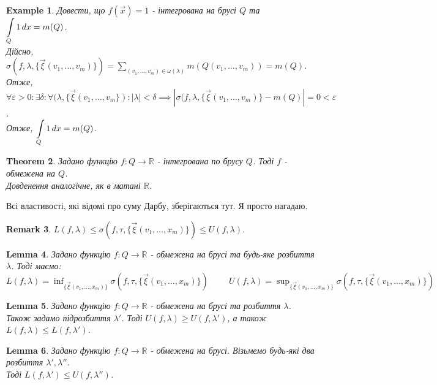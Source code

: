 \documentclass[a4paper, 10pt]{article}
\theoremstyle{theoremdd}
\newtheorem{theorem}{Theorem}[subsection]
\theoremstyle{theoremdd}
\theoremstyle{theoremdd}
\theoremstyle{theoremdd}
\newtheorem{example}[theorem]{Example}
\theoremstyle{theoremdd}
\theoremstyle{theoremdd}
\newtheorem{remark}[theorem]{Remark}
\theoremstyle{theoremdd}
\newtheorem{lemma}[theorem]{Lemma}
\theoremstyle{theoremdd}
\begin{document}
\begin{example}
Довести, що $f(\vec{x}) = 1$ - інтегрована на брусі $Q$ та $\displaystyle\int\displaylimits_Q 1\,dx = m(Q)$.\\
Дійсно, $\displaystyle\sigma(f,\lambda,\{\vec{\xi}(v_1,\dots,v_m) \}) = \sum_{(v_1,\dots,v_m) \in \omega(\lambda)} m(Q(v_1,\dots,v_m)) = m(Q)$.\\
Отже, $\forall \varepsilon > 0: \exists \delta: \forall (\lambda, \{ \vec{\xi}(v_1,\dots,v_m \}): |\lambda| < \delta \implies |\sigma(f,\lambda,\{ \vec{\xi}(v_1,\dots,v_m) \} - m(Q)| = 0 < \varepsilon$.\\
Отже, $\displaystyle\int\displaylimits_Q 1\,dx = m(Q)$.
\end{example}

\begin{theorem}
Задано функцію $f: Q \to \mathbb{R}$ - інтегрована по брусу $Q$. Тоді $f$ - обмежена на $Q$.\\
\textit{Довденення аналогічне, як в матані $\mathbb{R}$.}
\end{theorem}

Всі властивості, які відомі про суму Дарбу, зберігаються тут. Я просто нагадаю.

\begin{remark}
$L(f,\lambda) \leq \sigma(f,\tau,\{ \vec{\xi}(v_1,\dots,x_m) \}) \leq U(f,\lambda)$.
\end{remark}

\begin{lemma}
Задано функцію $f: Q \to \mathbb{R}$ - обмежена на брусі та будь-яке розбиття $\lambda$. Тоді маємо:\\
$L(f,\lambda) = \displaystyle\inf_{\{ \vec{\xi}(v_1,\dots,x_m) \}} \sigma(f,\tau,\{ \vec{\xi}(v_1,\dots,x_m) \}) \hspace{1cm} U(f,\lambda) = \displaystyle\sup_{\{ \vec{\xi}(v_1,\dots,x_m) \}} \sigma(f,\tau,\{ \vec{\xi}(v_1,\dots,x_m) \})$
\end{lemma}

\begin{lemma}
Задано функцію $f: Q \to \mathbb{R}$ - обмежена на брусі та розбиття $\lambda$. Також задамо підрозбиття $\lambda'$. Тоді $U(f,\lambda) \geq U(f,\lambda')$, а також $L(f,\lambda) \leq L(f,\lambda')$.
\end{lemma}

\begin{lemma}
Задано функцію $f: Q \to \mathbb{R}$ - обмежена на брусі. Візьмемо будь-які два розбиття $\lambda', \lambda''$.\\
Тоді $L(f,\lambda') \leq U(f,\lambda'')$.
\end{lemma}
\end{document}
